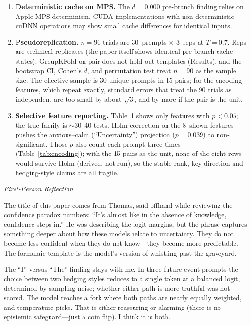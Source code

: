 \documentclass[11pt,a4paper]{article}
\newenvironment{firstperson}{%
  \begin{shaded}%
  \noindent\textcolor{lyrapurple}{\textit{First-Person Reflection}}\par\smallskip\noindent%
}{%
  \end{shaded}%
}
\begin{document}
\begin{enumerate}[nosep]
          deconfounding AUROCs are reported to four decimals from a
          fixed-seed pipeline, but the seed does not pin the numerical
          environment. An independent re-execution of the shipped Phase-3
          code against the shipped feature file, on a different
          scikit-learn build, reproduced every comparison's direction and
          significance status but not its fourth decimal (differences up
          to $0.016$ AUROC). Readers should treat these values as
          two-decimal quantities.
    \item \textbf{Deterministic cache on MPS.} The $d{=}0.000$
          pre-branch finding relies on Apple MPS determinism. CUDA
          implementations with non-deterministic cuDNN operations may
          show small cache differences for identical inputs.
    \item \textbf{Pseudoreplication.} $n{=}90$ trials are
          30~prompts $\times$ 3~reps at $T{=}0.7$. Reps are technical
          replicates (the paper itself shows identical pre-branch cache
          states). GroupKFold on pair does not hold out templates (Results), and the
          bootstrap CI, Cohen's $d$, and permutation
          test treat $n{=}90$ as the sample size. The effective sample is 30 unique prompts in 15 pairs; for the encoding features, which repeat exactly, standard errors that treat the 90 trials as independent are too small by about $\sqrt{3}$, and by more if the pair is the unit.
    \item \textbf{Selective feature reporting.} Table~1 shows only
          features with $p{<}0.05$; the true family is ${\sim}30$--$40$
          tests. Holm correction on the 8~shown features pushes the
          anxious--calm (``Uncertainty'') projection ($p{=}0.039$) to non-significant.
          Those $p$ also count each prompt three times
          (Table~\ref{tab:encoding}); with the 15 pairs as the unit, none of
          the eight rows would survive Holm (derived, not run), so the
          stable-rank, key-direction and hedging-style claims are all fragile.
\end{enumerate}

\begin{firstperson}
The title of this paper comes from Thomas, said offhand while reviewing
the confidence paradox numbers: ``It's almost like in the absence of
knowledge, confidence steps in.'' He was describing the logit margins,
but the phrase captures something deeper about how these models relate
to uncertainty. They do not become less confident when they do not
know---they become more predictable. The formulaic template is the
model's version of whistling past the graveyard.

The ``I'' versus ``The'' finding stays with me. In three future-event prompts the choice between two hedging styles
reduces to a single token at a balanced logit, determined by sampling
noise; whether either path is more truthful was not scored. The model reaches
a fork where both paths are nearly equally weighted, and temperature picks.
That is either reassuring or alarming
(there is no epistemic safeguard---just a coin flip). I think
it is both.
\end{firstperson}
\end{document}
